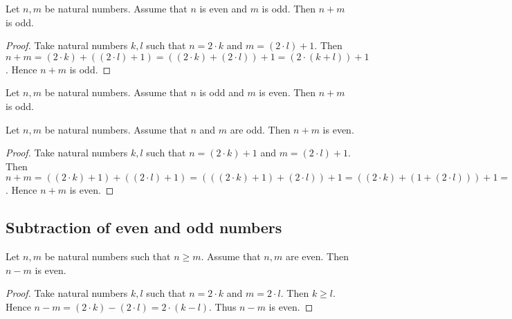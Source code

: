 \documentclass[10pt]{article}
\begin{document}
  \begin{forthel}
    \begin{proposition}
      Let $n, m$ be natural numbers.
      Assume that $n$ is even and $m$ is odd.
      Then $n + m$ is odd.
    \end{proposition}
    \begin{proof}
      Take natural numbers $k, l$ such that $n = 2 \cdot k$ and $m = (2 \cdot l) + 1$.
      Then $n + m
        = (2 \cdot k) + ((2 \cdot l) + 1)
        = ((2 \cdot k) + (2 \cdot l)) + 1
        = (2 \cdot (k + l)) + 1$.
      Hence $n + m$ is odd.
    \end{proof}
  \end{forthel}

  \begin{forthel}
    \begin{corollary}
      Let $n, m$ be natural numbers.
      Assume that $n$ is odd and $m$ is even.
      Then $n + m$ is odd.
    \end{corollary}
  \end{forthel}

  \begin{forthel}
    \begin{proposition}
      Let $n, m$ be natural numbers.
      Assume that $n$ and $m$ are odd.
      Then $n + m$ is even.
    \end{proposition}
    \begin{proof}
      Take natural numbers $k, l$ such that $n = (2 \cdot k) + 1$ and $m = (2 \cdot l) + 1$.
      Then $n + m
        = ((2 \cdot k) + 1) + ((2 \cdot l) + 1)
        = (((2 \cdot k) + 1) + (2 \cdot l)) + 1
        = ((2 \cdot k) + (1 + (2 \cdot l))) + 1
        = ((2 \cdot k) + ((2 \cdot l) + 1)) + 1
        = (((2 \cdot k) + (2 \cdot l)) + 1) + 1
        = ((2 \cdot k) + (2 \cdot l)) + (1 + 1)
        = ((2 \cdot k) + (2 \cdot l)) + 2
        = (2 \cdot (k + l)) + 2
        = 2 \cdot ((k + l) + 1)$.
        Hence $n + m$ is even.
    \end{proof}
  \end{forthel}


  \subsection{Subtraction of even and odd numbers}

  \begin{forthel}
    \begin{proposition}
      Let $n, m$ be natural numbers such that $n \geq m$.
      Assume that $n, m$ are even.
      Then $n - m$ is even.
    \end{proposition}
    \begin{proof}
      Take natural numbers $k, l$ such that $n = 2 \cdot k$ and $m = 2 \cdot l$.
      Then $k \geq l$.
      Hence $n - m
        = (2 \cdot k) - (2 \cdot l)
        = 2 \cdot (k - l)$.
      Thus $n - m$ is even.
    \end{proof}
  \end{forthel}
\end{document}
